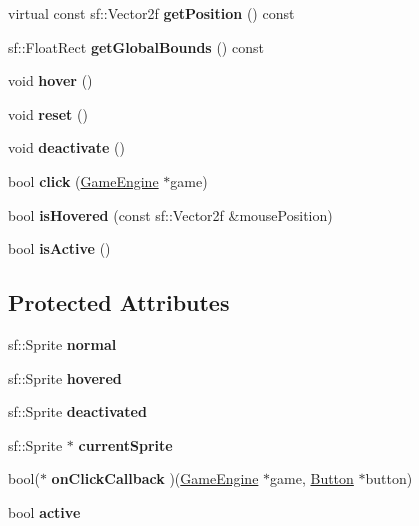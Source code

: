 \begin{DoxyCompactItemize}
virtual const sf\+::\+Vector2f {\bfseries get\+Position} () const
\item 
\mbox{\label{class_button_ab9d2e98e4940309543a9c94509f99437}} 
sf\+::\+Float\+Rect {\bfseries get\+Global\+Bounds} () const
\item 
\mbox{\label{class_button_a1a5ca19ed8efe0ea27625217dcab9f2c}} 
void {\bfseries hover} ()
\item 
\mbox{\label{class_button_ae34e8f3c482654e8585360fd639d02e3}} 
void {\bfseries reset} ()
\item 
\mbox{\label{class_button_a57efb09b51a4846a25e7f61abee78cd6}} 
void {\bfseries deactivate} ()
\item 
\mbox{\label{class_button_ac5e8ae25dcb8a33c6e8711ddbaed71bf}} 
bool {\bfseries click} (\mbox{\hyperlink{class_game_engine}{Game\+Engine}} $\ast$game)
\item 
\mbox{\label{class_button_a4d1a833e7e928d2fe25db3ba28f53e40}} 
bool {\bfseries is\+Hovered} (const sf\+::\+Vector2f \&mouse\+Position)
\item 
\mbox{\label{class_button_acf2ea3a5fea9e6cb24b291fabab033ff}} 
bool {\bfseries is\+Active} ()
\end{DoxyCompactItemize}
\subsection*{Protected Attributes}
\begin{DoxyCompactItemize}
\item 
\mbox{\label{class_button_a5a2a5e1c6b378762f5b2fe39e9053d9e}} 
sf\+::\+Sprite {\bfseries normal}
\item 
\mbox{\label{class_button_a181477cb3462763b510a30a4f27cd756}} 
sf\+::\+Sprite {\bfseries hovered}
\item 
\mbox{\label{class_button_a85f7fc9ea9ff8aae240469b0bddb662a}} 
sf\+::\+Sprite {\bfseries deactivated}
\item 
\mbox{\label{class_button_ae43bb88d6b390a0ab6607278102952c4}} 
sf\+::\+Sprite $\ast$ {\bfseries current\+Sprite}
\item 
\mbox{\label{class_button_abd70dfccd5cce2eb6d4cae1d684107c3}} 
bool($\ast$ {\bfseries on\+Click\+Callback} )(\mbox{\hyperlink{class_game_engine}{Game\+Engine}} $\ast$game, \mbox{\hyperlink{class_button}{Button}} $\ast$button)
\item 
\mbox{\label{class_button_a03070c78335786c482088bf00c894325}} 
bool {\bfseries active}
\end{DoxyCompactItemize}
